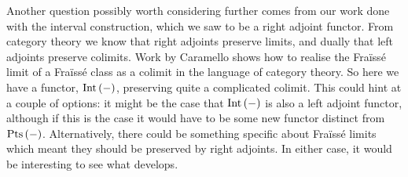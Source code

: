 Another question possibly worth considering further comes from our work done with the interval
construction, which we saw to be a right adjoint functor. From category theory we know that
right adjoints preserve limits, and dually that left adjoints preserve colimits. Work by
Caramello \cite{caramello08} shows how to realise the Fraïssé limit of a Fraïssé class as a
colimit in the language of category theory. So here we have a functor, $\text{Int}\left(-\right)$, preserving quite
a complicated colimit. This could hint at a couple of options: it might be the case that $\text{Int}\left(-\right)$ is
also a left adjoint functor, although if this is the case it would have to be some new functor
distinct from $\text{Pts}\left(-\right)$. Alternatively, there could be something specific about Fraïssé limits
which meant they should be preserved by right adjoints. In either case, it would be interesting to
see what develops.